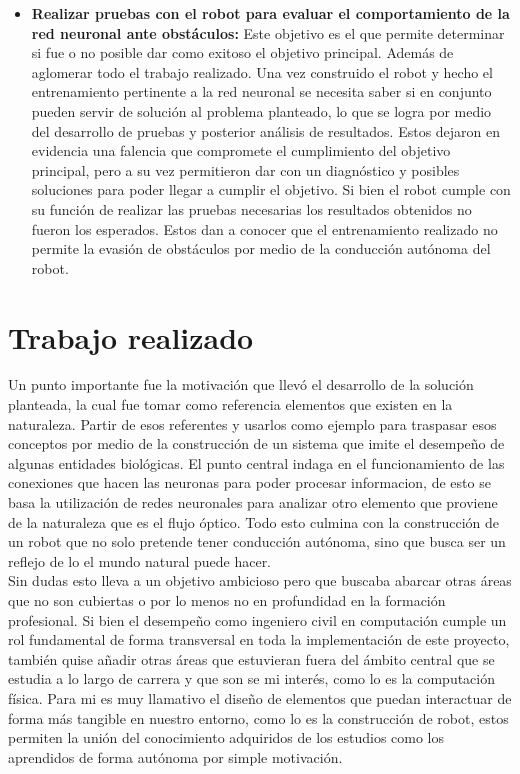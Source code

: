 \documentclass{iccmemoria}
\begin{document}
\begin{itemize}
	\item {\bf Realizar pruebas con el robot para evaluar el comportamiento de la red neuronal ante obstáculos:} Este objetivo es el que permite determinar si fue o no posible dar como exitoso el objetivo principal. Además de aglomerar todo el trabajo realizado. Una vez construido el robot y hecho el entrenamiento pertinente a la red neuronal se necesita saber si en conjunto pueden servir de solución al problema planteado, lo que se logra por medio del desarrollo de pruebas y posterior análisis de resultados. Estos dejaron en evidencia una falencia que compromete el cumplimiento del objetivo principal, pero a su vez permitieron dar con un diagnóstico y posibles soluciones para poder llegar a cumplir el objetivo. Si bien el robot cumple con su función de realizar las pruebas necesarias los resultados obtenidos no fueron los esperados. Estos dan a conocer que el entrenamiento realizado no permite la evasión de obstáculos por medio de la conducción autónoma del robot.\\
\end{itemize}

\section{Trabajo realizado}

Un punto importante fue la motivación que llevó el desarrollo de la solución planteada, la cual fue tomar como referencia elementos que existen en la naturaleza. Partir de esos referentes y usarlos como ejemplo para traspasar esos conceptos por medio de la construcción de un sistema que imite el desempeño de algunas entidades biológicas. El punto central indaga en el funcionamiento de las conexiones que hacen las neuronas para poder procesar informacion, de esto se basa la utilización de redes neuronales para analizar otro elemento que proviene de la naturaleza que es el flujo óptico. Todo esto culmina con la construcción de un robot que no solo pretende tener conducción autónoma, sino que busca ser un reflejo de lo el mundo natural puede hacer.\\

Sin dudas esto lleva a un objetivo ambicioso pero que buscaba abarcar otras áreas que no son cubiertas o por lo menos no en profundidad en la formación profesional. Si bien el desempeño como ingeniero civil en computación cumple un rol fundamental de forma transversal en toda la implementación de este proyecto, también quise añadir otras áreas que estuvieran fuera del ámbito central que se estudia a lo largo de carrera y que son se mi interés, como lo es la computación física. Para mi es muy llamativo el diseño de elementos que puedan interactuar de forma más tangible en nuestro entorno, como lo es la construcción de robot, estos permiten la unión del conocimiento adquiridos de los estudios como los aprendidos de forma autónoma por simple motivación.\\
\end{document}
